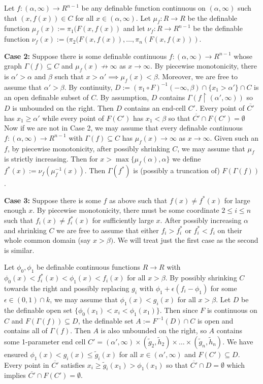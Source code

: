 \documentclass{article}
\theoremstyle{remark}
\theoremstyle{definition}
\theoremstyle{definition}
\theoremstyle{definition}
\theoremstyle{definition}
\begin{document}
    Let $f: (\alpha,\infty)\to R^{n-1}$ be any definable function continuous on $(\alpha,\infty)$ such that $(x,f(x))\in C$ for all $x\in(\alpha,\infty)$. Let $\mu_f:R\to R$ be the definable function $\mu_f(x):=\pi_1(F(x,f(x))$ and let $\nu_f:R\to R^{n-1}$ be the definable function $\nu_f(x):=(\pi_2(F(x,f(x)),\dots,\pi_n(F(x,f(x)))$.

    \textbf{Case 2:} Suppose there is some definable continuous $f:(\alpha,\infty)\to R^{n-1}$ whose graph $\Gamma(f)\subseteq C$ and $\mu_f(x)\not\to \infty$ as $x\to \infty$. By piecewise monotonicity, there is $\alpha'>\alpha$ and $\beta$ such that $x>\alpha'\implies \mu_f(x)<\beta$. Moreover, we are free to assume that $\alpha'>\beta$. By continuity, $D:=(\pi_1\circ F)^{-1}(-\infty,\beta)\cap \{x_1>\alpha'\}\cap C$ is an open definable subset of $C$. By assumption, $D$ contains $\Gamma(f\upharpoonright(\alpha',\infty))$ so $D$ is unbounded on the right. Then $D$ contains an end-cell $C'$. Every point of $\overline {C'}$ has $x_1\geq \alpha'$ while every point of $F(C')$ has $x_1<\beta$ so that $\overline{C'}\cap F(C')=\emptyset$\\

    Now if we are not in Case 2, we may assume that every definable continuous $f:(\alpha,\infty)\to R^{n-1}$ with $\Gamma(f)\subseteq C$ has $\mu_f(x)\to \infty$ as $x\to \infty$. Given such an $f$, by piecewise monotonicity, after possibly shrinking $C$, we may assume that $\mu_f$ is strictly increasing. Then for $x>\max\{\mu_f(\alpha),\alpha\}$ we define $f^*(x):=\nu_f(\mu_f^{-1}(x))$. Then $\Gamma(f^*)$ is (possibly a truncation of) $F(\Gamma(f))$.

    \textbf{Case 3:} Suppose there is some $f$ as above such that $f(x)\neq f^*(x)$ for large enough $x$. By piecewise monotonicity, there must be some coordinate $2\leq i\leq n$ such that $f_i(x)\neq f^*_i(x)$ for sufficiently large $x$. After possibly increasing $\alpha$ and shrinking $C$ we are free to assume that either $f_i>f^*_i$ or $f^*_i<f_i$ on their whole common domain (say $x>\beta)$. We will treat just the first case as the second is similar.
    
    Let $\phi_0,\phi_1$ be definable continuous functions $R\to R$ with $\phi_0(x)<f^*_i(x)<\phi_1(x)<f_i(x)$ for all $x>\beta$. By possibly shrinking $C$ towards the right and possibly replacing $g_i$ with $\phi_1+\epsilon(f_i-\phi_1)$ for some $\epsilon\in(0,1)\cap k$, we may assume that $\phi_1(x)<g_i(x)$ for all $x>\beta$. Let $D$ be the definable open set $\{\phi_0(x_1)<x_i<\phi_1(x_1)\}$. Then since $F$ is continuous on $C$ and $F(\Gamma(f))\subseteq D$, the definable set $A:=F^{-1}(D)\cap C$ is open and contains all of $\Gamma(f)$. Then $A$ is also unbounded on the right, so $A$ contains some 1-parameter end cell $C'=(\alpha',\infty)\times(\tilde{g}_2,\tilde{h}_2)\times\dots\times(\tilde{g}_n,\tilde{h}_n)$. We have ensured $\phi_1(x)<g_i(x)\leq\tilde{g}_i(x)$ for all $x\in(\alpha',\infty)$ and $F(C')\subseteq D$. Every point in $\overline{C'}$ satisfies $x_i \geq \tilde{g}_i(x_1)>\phi_1(x_1)$ so that $\overline{C'}\cap D=\emptyset$ which implies $\overline{C'}\cap F(C')=\emptyset$.
    \\
    
\end{document}
